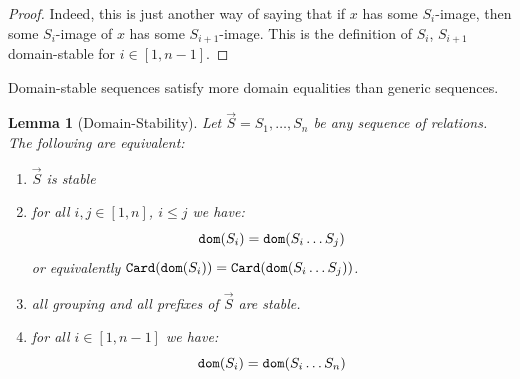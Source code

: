 \documentclass{lmcs}
\newtheorem{lemma}[theorem]{Lemma}
\begin{document}
\begin{proof}
Indeed, this is just another way of saying that if $x$ has some $S_i$-image,
then some $S_i$-image of $x$ has some $S_{i+1}$-image. This is the definition
of $S_i$, $S_{i+1}$ domain-stable for $i \in [1,n-1]$. 
\end{proof}

Domain-stable sequences satisfy more domain equalities than generic sequences.


\begin{lemma}[Domain-Stability]
\label{lemma-domain-stability}
Let $\vec{S}=S_1, \ldots, S_n$ be any sequence of relations. The following are equivalent:

\begin{enumerate}
\item
\label{lemma-domain-stability-01}
$\vec{S}$ is stable

\item
\label{lemma-domain-stability-02}
for all $i, j \in [1, n]$, $i \le j$ we have:
$$
{\tt dom}(S_i) =  {\tt dom}(S_i \ldots S_j)
$$
or equivalently ${\tt Card}({\tt dom}(S_i)) =  {\tt Card}({\tt dom}(S_i \ldots S_j))$.

\item
\label{lemma-domain-stability-03}
all grouping and all prefixes of $\vec{S}$ are stable.

\item 
\label{lemma-domain-stability-04}
for all $i \in [1,n-1]$ we have:
$$
{\tt dom}(S_i) = {\tt dom}(S_i \ldots S_n)
$$

\end{enumerate}



\end{lemma}
\end{document}
